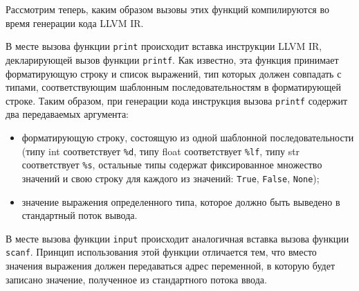 Рассмотрим теперь, каким образом вызовы этих функций компилируются во время генерации кода LLVM IR.

В месте вызова функции \verb|print| происходит вставка инструкции LLVM IR, декларирующей вызов функции \verb|printf|.
Как известно, эта функция принимает форматирующую строку и список выражений, тип которых должен совпадать с типами, соответствующим шаблонным последовательностям в форматирующей строке.
Таким образом, при генерации кода инструкция вызова \verb|printf| содержит два передаваемых аргумента:

\begin{itemize}
  \item форматирующую строку, состоящую из одной шаблонной последовательности (типу int соответствует \verb|%d|, типу float соответствует \verb|%lf|, типу str соответствует \verb|%s|, остальные типы содержат фиксированное множество значений и свою строку для каждого из значений: \verb|True|, \verb|False|, \verb|None|);
  \item значение выражения определенного типа, которое должно быть выведено в стандартный поток вывода.
\end{itemize}

В месте вызова функции \verb|input| происходит аналогичная вставка вызова функции \verb|scanf|.
Принцип использования этой функции отличается тем, что вместо значения выражения должен передаваться адрес переменной, в которую будет записано значение, полученное из стандартного потока ввода.
